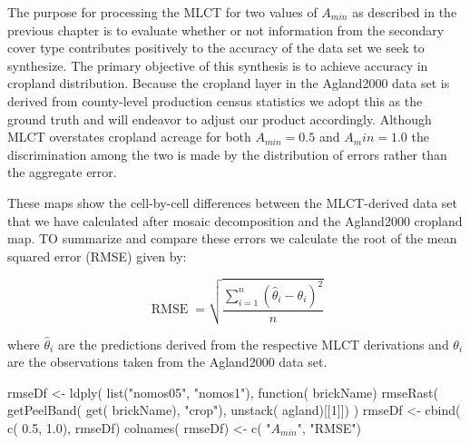 The purpose for processing the MLCT for two values of $A_{min}$ as
described in the previous chapter is to evaluate whether or not
information from the secondary cover type contributes positively to
the accuracy of the data set we seek to synthesize.  The primary
objective of this synthesis is to achieve accuracy in cropland
distribution.  Because the cropland layer in the Agland2000 data set
is derived from county-level production census statistics we adopt
this as the ground truth and will endeavor to adjust our product
accordingly.  Although MLCT overstates cropland acreage for both
$A_{min}=0.5$ and $A_min=1.0$ the discrimination among the two is made
by the distribution of errors rather than the aggregate error.


These maps show the cell-by-cell differences between the MLCT-derived
data set that we have calculated after mosaic decomposition and the
Agland2000 cropland map.  TO summarize and compare these errors we
calculate the root of the mean squared error (RMSE) given by:

$$
\operatorname{RMSE}=\sqrt{\frac{\sum_{i=1}^{n}(\hat\theta_i-\theta_i )^2}{n}}
$$

where $\hat\theta_i$ are the predictions derived from the respective
MLCT derivations and $\theta_i$ are the observations taken from the
Agland2000 data set.


\begin{Schunk}
\begin{Sinput}
 rmseDf <- ldply( list("nomos05", "nomos1"),
                 function( brickName) {
                   rmseRast( getPeelBand( get( brickName), "crop"),
                            unstack( agland)[[1]])
                 })
 rmseDf <- cbind( c( 0.5, 1.0), rmseDf)
 colnames( rmseDf) <- c( "$A_{min}$", "RMSE")
 
 
\end{Sinput}
\end{Schunk}



